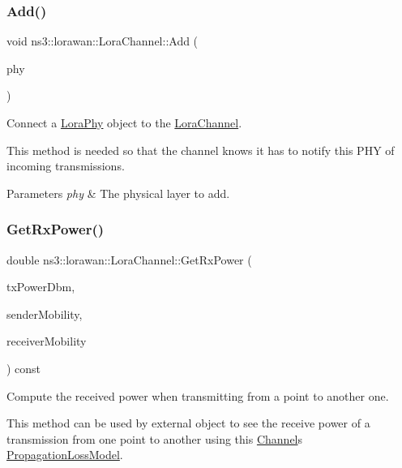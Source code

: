 \subsubsection{\texorpdfstring{Add()}{Add()}}
{\footnotesize\ttfamily void ns3\+::lorawan\+::\+Lora\+Channel\+::\+Add (\begin{DoxyParamCaption}\item[{Ptr$<$ \hyperlink{classns3_1_1lorawan_1_1LoraPhy}{Lora\+Phy} $>$}]{phy }\end{DoxyParamCaption})}

Connect a \hyperlink{classns3_1_1lorawan_1_1LoraPhy}{Lora\+Phy} object to the \hyperlink{classns3_1_1lorawan_1_1LoraChannel}{Lora\+Channel}.

This method is needed so that the channel knows it has to notify this P\+HY of incoming transmissions.


\begin{DoxyParams}{Parameters}
{\em phy} & The physical layer to add. \\
\hline
\end{DoxyParams}
\mbox{\label{classns3_1_1lorawan_1_1LoraChannel_a8c975d8f8eecae5f75b35a1a409a58eb}} 
\subsubsection{\texorpdfstring{Get\+Rx\+Power()}{GetRxPower()}}
{\footnotesize\ttfamily double ns3\+::lorawan\+::\+Lora\+Channel\+::\+Get\+Rx\+Power (\begin{DoxyParamCaption}\item[{double}]{tx\+Power\+Dbm,  }\item[{Ptr$<$ Mobility\+Model $>$}]{sender\+Mobility,  }\item[{Ptr$<$ Mobility\+Model $>$}]{receiver\+Mobility }\end{DoxyParamCaption}) const}

Compute the received power when transmitting from a point to another one.

This method can be used by external object to see the receive power of a transmission from one point to another using this \hyperlink{classChannel}{Channel}\textquotesingle{}s \hyperlink{classPropagationLossModel}{Propagation\+Loss\+Model}.


